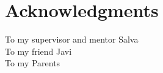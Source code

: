 \chapter*{Acknowledgments}

\thispagestyle{empty}

\vspace{1cm}

\begin{flushright}
	To my supervisor and mentor Salva \\
	\vspace{0.13cm}
	To my friend Javi\\
	\vspace{0.13cm}
	To my Parents
\end{flushright}